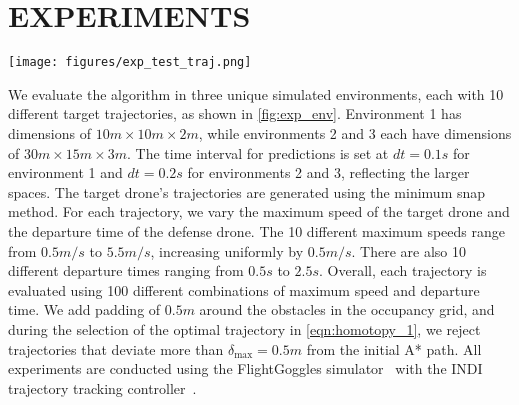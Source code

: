 \section{EXPERIMENTS}

\begin{figure*}[]
    \centering
    \texttt{[image: figures/exp\_test\_traj.png]}
    \caption{Simulation environments and trajectories used for evaluation. 
    Red paths represent the target drone's trajectories, and blue paths represent the defense drone's.
    }
    \label{fig:exp_env}
    \vspace{-1\baselineskip}
\end{figure*}

We evaluate the algorithm in three unique simulated environments, each with 10 different target trajectories, as shown in \cref{fig:exp_env}. 
Environment 1 has dimensions of $10 \si{m} \times 10 \si{m} \times 2 \si{m}$, while environments 2 and 3 each have dimensions of $30 \si{m} \times 15 \si{m} \times 3 \si{m}$. 
The time interval for predictions is set at $dt = 0.1 \si{s}$ for environment 1 and $dt = 0.2 \si{s}$ for environments 2 and 3, reflecting the larger spaces.
The target drone's trajectories are generated using the minimum snap method. 
For each trajectory, we vary the maximum speed of the target drone and the departure time of the defense drone. 
The 10 different maximum speeds range from $0.5 \si{m/s}$ to $5.5 \si{m/s}$, increasing uniformly by $0.5 \si{m/s}$. 
There are also 10 different departure times ranging from $0.5 \si{s}$ to $2.5 \si{s}$. 
Overall, each trajectory is evaluated using 100 different combinations of maximum speed and departure time. 
We add padding of $0.5 \si{m}$ around the obstacles in the occupancy grid, and during the selection of the optimal trajectory in \eqref{eqn:homotopy_1}, we reject trajectories that deviate more than $\delta_\text{max} = 0.5 \si{m}$ from the initial A* path.
All experiments are conducted using the FlightGoggles simulator~\cite{guerra2019flightgoggles} with the INDI trajectory tracking controller~\cite{tal2018accurate}.

